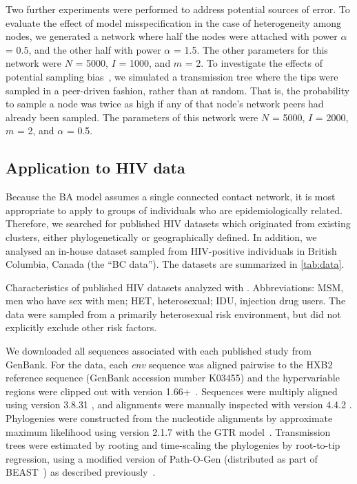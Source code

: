 Two further experiments were performed to address potential sources of error.
To evaluate the effect of model misspecification in the case of heterogeneity
among nodes, we generated a network where half the nodes were attached with
power $\alpha$ = 0.5, and the other half with power $\alpha$ = 1.5. The other
parameters for this network were $N$ = 5000, $I$ = 1000, and $m$ = 2. To
investigate the effects of potential sampling
bias~\autocite{karcher2016quantifying}, we simulated a transmission tree where
the tips were sampled in a peer-driven fashion, rather than at random. That is,
the probability to sample a node was twice as high if any of that node's
network peers had already been sampled. The parameters of this network were $N$
= 5000, $I$ = 2000, $m$ = 2, and $\alpha$ = 0.5.

\subsection{Application to HIV data}

Because the \gls{BA} model assumes a single connected contact network, it is
most appropriate to apply to groups of individuals who are epidemiologically
related. Therefore, we searched for published \gls{HIV} datasets which
originated from existing clusters, either phylogenetically or geographically
defined. In addition, we analysed an in-house dataset sampled from
\gls{HIV}-positive individuals in British Columbia, Canada (the ``BC data'').
The datasets are summarized in \cref{tab:data}.

\begin{table}[ht]
  \centering
  
  \caption[Characteristics of published HIV datasets analyzed with .]
  {
    Characteristics of published HIV datasets analyzed with . 
    Abbreviations: MSM, men who have sex with men; HET, heterosexual; IDU,
    injection drug users. The \textcite{novitsky2013phylogenetic,novitsky2014impact} data
    were sampled from a primarily heterosexual risk environment, but did not
    explicitly exclude other risk factors.
  }
  \label{tab:data}
\end{table}

We downloaded all sequences associated with each published study from GenBank.
For the \textcite{novitsky2014impact} data, each \textit{env} sequence was
aligned pairwise to the HXB2 reference sequence (GenBank accession number
K03455) and the hypervariable regions were clipped out with
 version 1.66+~\autocite{cock2009biopython}. Sequences were
multiply aligned using  version 3.8.31
\autocite{edgar2004muscle}, and alignments were manually inspected with
 version 4.4.2 \autocite{gouy2010seaview}. Phylogenies were
constructed from the nucleotide alignments by approximate maximum likelihood
using  version 2.1.7 \autocite{price2010fasttree} with the
\gls{GTR} model~\autocite{tavare1986some}. Transmission trees were estimated by
rooting and time-scaling the phylogenies by root-to-tip regression, using a
modified version of Path-O-Gen (distributed as part of
BEAST~\autocite{drummond2007beast}) as described
previously~\autocite{poon2015phylodynamic}. 

